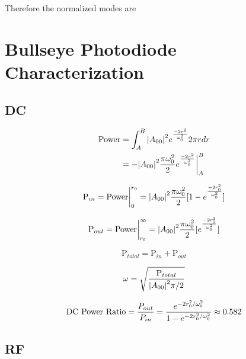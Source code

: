 \documentclass[oneside]{book}
\begin{document}
\begin{appendices}
	Therefore the normalized modes are
	
	
	
	


	
	

	
	
	
	\chapter{Bullseye Photodiode Characterization}
	
	\section{DC}
	\begin{equation}
	\begin{split}
	\text{Power} &= \int_{A}^{B} \abs{A_{00}}^2e^{\frac{-2r^2}{\omega_{0}^2}} 2\pi r dr\\
			&= -\abs{A_{00}}^2 \frac{\pi \omega_{0}^2}{2} e^{\frac{-2r^2}{\omega_{0}^2}} \biggr\rvert_A^B
	\end{split}
	\end{equation}
	
	\begin{equation}
	\text{P}_{in} = \text{Power} \biggr\rvert_0^{r_0} = \abs{A_{00}}^2 \frac{\pi \omega_{0}^2}{2} [1 - e^{\frac{-2r_0^2}{\omega_{0}^2}}]
	\end{equation}
	
	\begin{equation}
	\text{P}_{out} = \text{Power} \biggr\rvert_{r_0}^{\infty} = \abs{A_{00}}^2 \frac{\pi \omega_{0}^2}{2} [e^{\frac{-2r_0^2}{\omega_{0}^2}}]
	\end{equation}
	
	\begin{equation}
	\text{P}_{total} =  \text{P}_{in} + \text{P}_{out}
	\end{equation}
	
	\begin{equation}
	\omega = \sqrt{\frac{\text{P}_{total}}{\abs{A_{00}}^2 \pi / 2}}
	\end{equation}
	
	\begin{equation}
	\text{DC Power Ratio} 
	= \frac{P_{out}}{P_{in}} \\
	= \frac{e^{-2r_0^2/ \omega_{0}^2}} {1 - e^{-2r_0^2/ \omega_{0}^2 }} \approx 0.582
	\end{equation}
	
	\section{RF}
	

\end{appendices}
\end{document}
